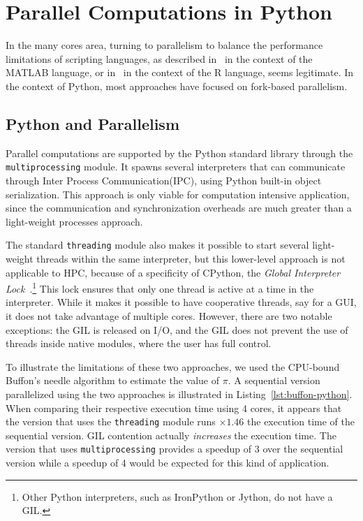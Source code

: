 \documentclass[conference]{IEEEtran}
\begin{document}
\section{Parallel Computations in Python}\label{sec:python-parallel}

In the many cores area, turning to parallelism to balance the performance
limitations of scripting languages, as described in~\cite{choy05} in the context
of the MATLAB language, or in~\cite{mals07} in the context of the R language,
seems legitimate. In the context of Python, most approaches have focused on
fork-based parallelism.

\subsection{Python and Parallelism}

Parallel computations are supported by the Python standard library through the
\texttt{multiprocessing} module. It spawns several interpreters that can
communicate through Inter Process Communication(IPC), using Python built-in
object serialization. This approach is only viable for computation intensive
application, since the communication and synchronization overheads are much
greater than a light-weight processes approach.

The standard \texttt{threading} module also makes it possible to start
several light-weight threads within the same interpreter, but this lower-level approach is not
applicable to HPC, because of a specificity of CPython, the \emph{Global
Interpreter Lock}~\cite{gil2012}.\footnote{Other Python interpreters, such as
IronPython or Jython, do not have a GIL.} This lock ensures that only one thread
is active at a time in the interpreter. While it makes it possible to have
cooperative threads, say for a GUI, it does not take advantage of multiple
cores.  However, there are two notable exceptions: the GIL is released on I/O,
and the GIL does not prevent the use of threads inside native modules, where the
user has full control.

To illustrate the limitations of these two approaches, we used the CPU-bound
Buffon's needle algorithm to estimate the value of $\pi$. A sequential version
parallelized using the two approaches is illustrated in
Listing~\ref{lst:buffon-python}. When comparing their respective execution time
using 4 cores, it appears that the version that uses the \texttt{threading}
module runs $\times 1.46$ the execution time of the sequential version. GIL
contention actually \emph{increases} the execution time. The version that uses
\texttt{multiprocessing} provides a speedup of 3 over the sequential version
while a speedup of 4 would be expected for this kind of application.
\end{document}
